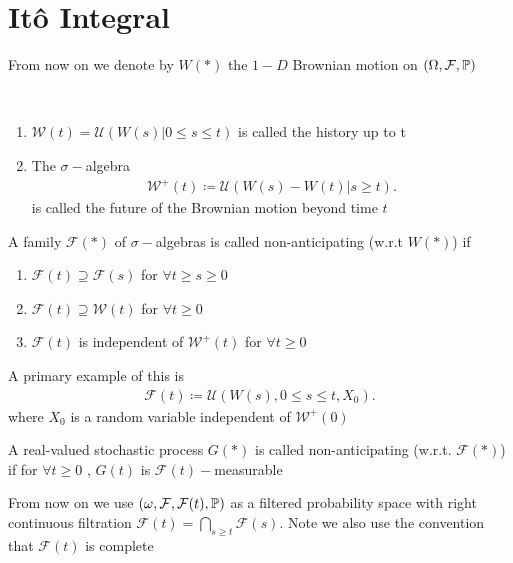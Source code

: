 \section{It\^o Integral}
From now on we denote by $W(*)$ the $1-D$ Brownian motion on $(\Omega ,\mathcal{F},\P)$
\begin{definition}
  \hspace{0mm}\\
  \begin{enumerate}
    \item $\mathcal{W}(t) = \mathcal{U}(W(s) | 0 \le s \le t)$ is called the history up to t
    \item The $\sigma-$algebra 
      \begin{align*}
        \mathcal{W}^{+}(t) \coloneqq \mathcal{U}(W(s)-W(t) | s\ge t) 
      .\end{align*}
      is called the future of the Brownian motion beyond time $t$
  \end{enumerate}
\end{definition}
\begin{definition}
 A family $\mathcal{F}(*)$  of $\sigma-$algebras is called non-anticipating (w.r.t $W(*)$) if 
 \begin{enumerate}
   \item $\mathcal{F}(t) \supseteq \mathcal{F}(s)$ for $\forall t \ge  s \ge 0$ 
   \item $\mathcal{F}(t) \supseteq \mathcal{W}(t)$ for $\forall t \ge 0$ 
   \item $\mathcal{F}(t)$ is independent of $\mathcal{W}^{+}(t) $ for $\forall t \ge 0$ 
 \end{enumerate}
\end{definition}
A primary example of this is 
\begin{align*}
  \mathcal{F}(t) \coloneqq \mathcal{U}(W(s) , 0\le s\le t, X_{0})
.\end{align*}
where $X_{0}$ is a random variable independent of $\mathcal{W}^{+}(0) $
\begin{definition}
 A real-valued stochastic process $G(*)$  is called non-anticipating (w.r.t. $\mathcal{F}(*)$) if 
 for $\forall t \ge  0$ , $G(t)$ is $\mathcal{F}(t)-$measurable
\end{definition}
From now on we use $(\omega,\mathcal{F},\mathcal{F}(t),\P)$ as a filtered probability space with right continuous filtration 
$\mathcal{F}(t) = \bigcap_{s \ge t} \mathcal{F}(s)$. Note we also use the convention that $\mathcal{F}(t)$ is complete 
